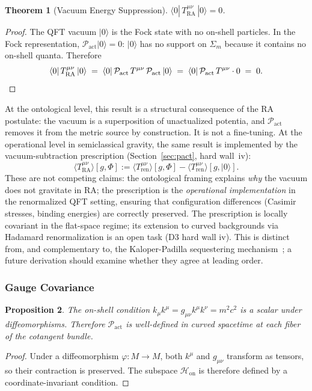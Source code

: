 \documentclass[11pt,a4paper]{article}
\theoremstyle{plain}
\newtheorem{theorem}{Theorem}[section]
\newtheorem{proposition}[theorem]{Proposition}
\theoremstyle{definition}
\theoremstyle{remark}
\newcommand{\Pact}{\mathcal{P}_{\mathrm{act}}}
\newcommand{\Hon}{\mathcal{H}_{\mathrm{on}}}
\newcommand{\Sigmam}{\Sigma_{m}}
\newcommand{\Tact}{T^{\mu\nu}_{\mathrm{RA}}}
\newcommand{\ket}[1]{|#1\rangle}
\begin{document}
\begin{theorem}[Vacuum Energy Suppression]
\label{thm:vacuum}
$\langle 0|\,\Tact\,|0\rangle = 0$.
\end{theorem}
\begin{proof}
The QFT vacuum $\ket{0}$ is the Fock state with no on-shell particles. In the Fock
representation, $\Pact\ket{0} = 0$: $\ket{0}$ has no support on $\Sigmam$ because
it contains no on-shell quanta. Therefore
\begin{equation*}
  \langle 0|\,\Tact\,|0\rangle
  \;=\;
  \langle 0|\,\Pact\,T^{\mu\nu}\,\Pact\,|0\rangle
  \;=\;
  \langle 0|\,\Pact\,T^{\mu\nu}\cdot 0
  \;=\; 0. \qedhere
\end{equation*}
\end{proof}

At the ontological level, this result is a structural consequence of the RA
postulate: the vacuum is a superposition of unactualized potentia, and $\Pact$
removes it from the metric source by construction. It is not a fine-tuning.
At the operational level in semiclassical gravity, the same result is implemented
by the vacuum-subtraction prescription (Section~\ref{sec:pact}, hard wall~iv):
\begin{equation*}
  \langle\Tact\rangle[g,\Phi]
  := \langle T^{\mu\nu}_{\mathrm{ren}}\rangle[g,\Phi]
   - \langle T^{\mu\nu}_{\mathrm{ren}}\rangle[g,\ket{0}].
\end{equation*}
These are not competing claims: the ontological framing explains \emph{why} the
vacuum does not gravitate in RA; the prescription is the \emph{operational
implementation} in the renormalized QFT setting, ensuring that configuration
differences (Casimir stresses, binding energies) are correctly preserved.
The prescription is locally covariant in the flat-space regime; its extension
to curved backgrounds via Hadamard renormalization is an open task (D3 hard wall iv).
This is distinct from, and complementary to, the Kaloper-Padilla sequestering
mechanism~\citep{KaloperPadilla2014}; a future derivation should examine whether
they agree at leading order.

\subsubsection{Gauge Covariance}

\begin{proposition}
The on-shell condition $k_{\mu}k^{\mu} = g_{\mu\nu}k^{\mu}k^{\nu} = m^{2}c^{2}$
is a scalar under diffeomorphisms. Therefore $\Pact$ is well-defined in curved
spacetime at each fiber of the cotangent bundle.
\end{proposition}
\begin{proof}
Under a diffeomorphism $\varphi: M \to M$, both $k^{\mu}$ and $g_{\mu\nu}$
transform as tensors, so their contraction is preserved. The subspace $\Hon$ is
therefore defined by a coordinate-invariant condition.
\end{proof}
\end{document}
